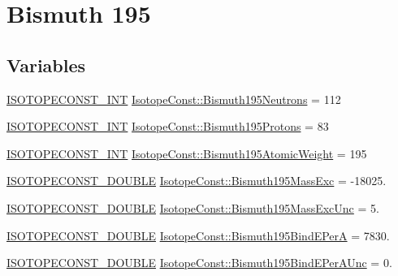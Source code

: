 \hypertarget{group___isotope_const-_bismuth-_bi195}{}\section{Bismuth 195}
\label{group___isotope_const-_bismuth-_bi195}
\subsection*{Variables}
\begin{DoxyCompactItemize}
\item 
\mbox{\hyperlink{group___isotope_const-_macros_ga5f18360b3e99483a35c32d789e62621c}{I\+S\+O\+T\+O\+P\+E\+C\+O\+N\+S\+T\+\_\+\+I\+NT}} \mbox{\hyperlink{group___isotope_const-_bismuth-_bi195_ga40f6139d17b961eb337e9b1343bf99a7}{Isotope\+Const\+::\+Bismuth195\+Neutrons}} = 112
\item 
\mbox{\hyperlink{group___isotope_const-_macros_ga5f18360b3e99483a35c32d789e62621c}{I\+S\+O\+T\+O\+P\+E\+C\+O\+N\+S\+T\+\_\+\+I\+NT}} \mbox{\hyperlink{group___isotope_const-_bismuth-_bi195_gabd84e970f4138a3f095b40b9eefd7bdb}{Isotope\+Const\+::\+Bismuth195\+Protons}} = 83
\item 
\mbox{\hyperlink{group___isotope_const-_macros_ga5f18360b3e99483a35c32d789e62621c}{I\+S\+O\+T\+O\+P\+E\+C\+O\+N\+S\+T\+\_\+\+I\+NT}} \mbox{\hyperlink{group___isotope_const-_bismuth-_bi195_ga2414c21d19e6c3023ebbba33d3072c6d}{Isotope\+Const\+::\+Bismuth195\+Atomic\+Weight}} = 195
\item 
\mbox{\hyperlink{group___isotope_const-_macros_ga8f45a7272ce02c0b4c65c44636ed719a}{I\+S\+O\+T\+O\+P\+E\+C\+O\+N\+S\+T\+\_\+\+D\+O\+U\+B\+LE}} \mbox{\hyperlink{group___isotope_const-_bismuth-_bi195_ga7805e0fef857c501699e3d756a3de119}{Isotope\+Const\+::\+Bismuth195\+Mass\+Exc}} = -\/18025.
\item 
\mbox{\hyperlink{group___isotope_const-_macros_ga8f45a7272ce02c0b4c65c44636ed719a}{I\+S\+O\+T\+O\+P\+E\+C\+O\+N\+S\+T\+\_\+\+D\+O\+U\+B\+LE}} \mbox{\hyperlink{group___isotope_const-_bismuth-_bi195_gad5492f95e1b0b15fbcf8f864d708506e}{Isotope\+Const\+::\+Bismuth195\+Mass\+Exc\+Unc}} = 5.
\item 
\mbox{\hyperlink{group___isotope_const-_macros_ga8f45a7272ce02c0b4c65c44636ed719a}{I\+S\+O\+T\+O\+P\+E\+C\+O\+N\+S\+T\+\_\+\+D\+O\+U\+B\+LE}} \mbox{\hyperlink{group___isotope_const-_bismuth-_bi195_gade90c23cd7183cfebec2ca085081eb5c}{Isotope\+Const\+::\+Bismuth195\+Bind\+E\+PerA}} = 7830.
\item 
\mbox{\hyperlink{group___isotope_const-_macros_ga8f45a7272ce02c0b4c65c44636ed719a}{I\+S\+O\+T\+O\+P\+E\+C\+O\+N\+S\+T\+\_\+\+D\+O\+U\+B\+LE}} \mbox{\hyperlink{group___isotope_const-_bismuth-_bi195_gab659b140684a9c4eb342b686c9dd4934}{Isotope\+Const\+::\+Bismuth195\+Bind\+E\+Per\+A\+Unc}} = 0.

\end{DoxyCompactItemize}
